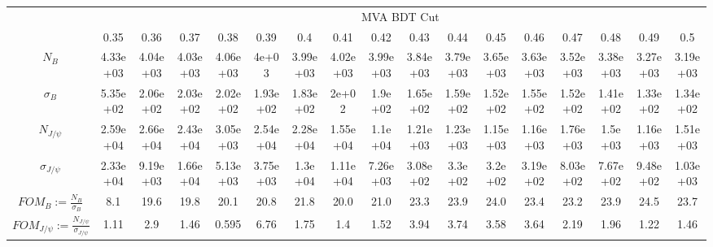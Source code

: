 \begin{table}[!h]
\centering
\begin{adjustbox}{width=18cm, rotate=90}
\begin{tabular}{*{1}{c|}*{16}{c}}
& \multicolumn{16}{c}{MVA BDT Cut}\\
& 0.35& 0.36& 0.37& 0.38& 0.39& 0.4& 0.41& 0.42& 0.43& 0.44& 0.45& 0.46& 0.47& 0.48& 0.49& 0.5\\ \hline
$N_B$& 4.33e+03& 4.04e+03& 4.03e+03& 4.06e+03& 4e+03& 3.99e+03& 4.02e+03& 3.99e+03& 3.84e+03& 3.79e+03& 3.65e+03& 3.63e+03& 3.52e+03& 3.38e+03& 3.27e+03& 3.19e+03\\
$\sigma_B$& 5.35e+02& 2.06e+02& 2.03e+02& 2.02e+02& 1.93e+02& 1.83e+02& 2e+02& 1.9e+02& 1.65e+02& 1.59e+02& 1.52e+02& 1.55e+02& 1.52e+02& 1.41e+02& 1.33e+02& 1.34e+02\\
$N_{J/\psi}$& 2.59e+04& 2.66e+04& 2.43e+04& 3.05e+03& 2.54e+04& 2.28e+04& 1.55e+04& 1.1e+04& 1.21e+03& 1.23e+03& 1.15e+03& 1.16e+03& 1.76e+03& 1.5e+03& 1.16e+03& 1.51e+03\\
$\sigma_{J/\psi}$& 2.33e+04& 9.19e+03& 1.66e+04& 5.13e+03& 3.75e+03& 1.3e+04& 1.11e+04& 7.26e+03& 3.08e+02& 3.3e+02& 3.2e+02& 3.19e+02& 8.03e+02& 7.67e+02& 9.48e+02& 1.03e+03\\ \hline
$FOM_{B}:=\frac{N_B}{\sigma_B}$& 8.1& 19.6& 19.8& 20.1& 20.8& 21.8& 20.0& 21.0& 23.3& 23.9& 24.0& 23.4& 23.2& 23.9& 24.5& 23.7\\
$FOM_{J/\psi}:=\frac{N_{J/\psi}}{\sigma_{J/\psi}}$& 1.11& 2.9& 1.46& 0.595& 6.76& 1.75& 1.4& 1.52& 3.94& 3.74& 3.58& 3.64& 2.19& 1.96& 1.22& 1.46\\ \hline
\end{tabular}
\end{adjustbox}
\end{table}

